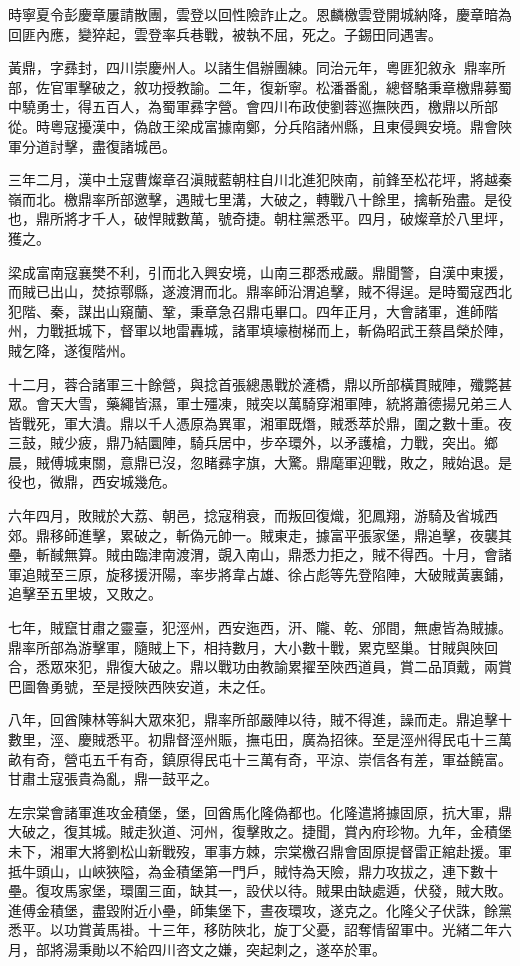 \begin{pinyinscope}
時寧夏令彭慶章屢請散團，雲登以回性險詐止之。恩麟檄雲登開城納降，慶章暗為回匪內應，變猝起，雲登率兵巷戰，被執不屈，死之。子錫田同遇害。

黃鼎，字彞封，四川崇慶州人。以諸生倡辦團練。同治元年，粵匪犯敘永，鼎率所部，佐官軍擊破之，敘功授教諭。二年，復新寧。松潘番亂，總督駱秉章檄鼎募蜀中驍勇士，得五百人，為蜀軍彞字營。會四川布政使劉蓉巡撫陜西，檄鼎以所部從。時粵寇擾漢中，偽啟王梁成富據南鄭，分兵陷諸州縣，且東侵興安境。鼎會陜軍分道討擊，盡復諸城邑。

三年二月，漢中土寇曹燦章召滇賊藍朝柱自川北進犯陜南，前鋒至松花坪，將越秦嶺而北。檄鼎率所部邀擊，遇賊七里溝，大破之，轉戰八十餘里，擒斬殆盡。是役也，鼎所將才千人，破悍賊數萬，號奇捷。朝柱黨悉平。四月，破燦章於八里坪，獲之。

梁成富南寇襄樊不利，引而北入興安境，山南三郡悉戒嚴。鼎聞警，自漢中東援，而賊已出山，焚掠鄠縣，遂渡渭而北。鼎率師沿渭追擊，賊不得逞。是時蜀寇西北犯階、秦，謀出山窺蘭、鞏，秉章急召鼎屯畢口。四年正月，大會諸軍，進師階州，力戰抵城下，督軍以地雷轟城，諸軍填壕樹梯而上，斬偽昭武王蔡昌榮於陣，賊乞降，遂復階州。

十二月，蓉合諸軍三十餘營，與捻首張總愚戰於滻橋，鼎以所部橫貫賊陣，殲斃甚眾。會天大雪，藥繩皆濕，軍士殭凍，賊突以萬騎穿湘軍陣，統將蕭德揚兄弟三人皆戰死，軍大潰。鼎以千人憑原為異軍，湘軍既熸，賊悉萃於鼎，圍之數十重。夜三鼓，賊少疲，鼎乃結圜陣，騎兵居中，步卒環外，以矛護槍，力戰，突出。鄉晨，賊傅城東關，意鼎已沒，忽睹彞字旗，大驚。鼎麾軍迎戰，敗之，賊始退。是役也，微鼎，西安城幾危。

六年四月，敗賊於大荔、朝邑，捻寇稍衰，而叛回復熾，犯鳳翔，游騎及省城西郊。鼎移師進擊，累破之，斬偽元帥一。賊東走，據富平張家堡，鼎追擊，夜襲其壘，斬馘無算。賊由臨津南渡渭，覬入南山，鼎悉力拒之，賊不得西。十月，會諸軍追賊至三原，旋移援汧陽，率步將韋占雄、徐占彪等先登陷陣，大破賊黃裏鋪，追擊至五里坡，又敗之。

七年，賊竄甘肅之靈臺，犯涇州，西安迤西，汧、隴、乾、邠間，無慮皆為賊據。鼎率所部為游擊軍，隨賊上下，相持數月，大小數十戰，累克堅巢。甘賊與陜回合，悉眾來犯，鼎復大破之。鼎以戰功由教諭累擢至陜西道員，賞二品頂戴，兩賞巴圖魯勇號，至是授陜西陜安道，未之任。

八年，回酋陳林等糾大眾來犯，鼎率所部嚴陣以待，賊不得進，譟而走。鼎追擊十數里，涇、慶賊悉平。初鼎督涇州賑，撫屯田，廣為招徠。至是涇州得民屯十三萬畝有奇，營屯五千有奇，鎮原得民屯十三萬有奇，平涼、崇信各有差，軍益饒富。甘肅土寇張貴為亂，鼎一鼓平之。

左宗棠會諸軍進攻金積堡，堡，回酋馬化隆偽都也。化隆遣將據固原，抗大軍，鼎大破之，復其城。賊走狄道、河州，復擊敗之。捷聞，賞內府珍物。九年，金積堡未下，湘軍大將劉松山新戰歿，軍事方棘，宗棠檄召鼎會固原提督雷正綰赴援。軍抵牛頭山，山峽狹隘，為金積堡第一門戶，賊恃為天險，鼎力攻拔之，連下數十壘。復攻馬家堡，環圍三面，缺其一，設伏以待。賊果由缺處遁，伏發，賊大敗。進傅金積堡，盡毀附近小壘，師集堡下，晝夜環攻，遂克之。化隆父子伏誅，餘黨悉平。以功賞黃馬褂。十三年，移防陜北，旋丁父憂，詔奪情留軍中。光緒二年六月，部將湯秉勛以不給四川咨文之嫌，突起刺之，遂卒於軍。


\end{pinyinscope}
